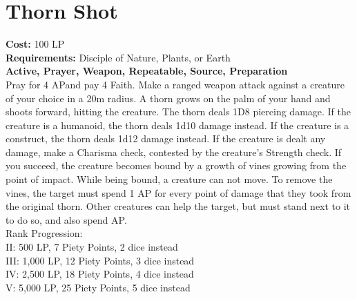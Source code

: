 \section{Thorn Shot}\label{prayer:thornShot}
\textbf{Cost:} 100 LP\\
\textbf{Requirements:} Disciple of Nature, Plants, or Earth \\
\textbf{Active, Prayer, Weapon, Repeatable, Source, Preparation}\\
Pray for 4 APand pay 4 Faith.
Make a ranged weapon attack against a creature of your choice in a 20m radius.
A thorn grows on the palm of your hand and shoots forward, hitting the creature.
The thorn deals 1D8 piercing damage.
If the creature is a humanoid, the thorn deals 1d10 damage instead.
If the creature is a construct, the thorn deals 1d12 damage instead.
If the creature is dealt any damage, make a Charisma check, contested by the creature's Strength check.
If you succeed, the creature becomes bound by a growth of vines growing from the point of impact.
While being bound, a creature can not move.
To remove the vines, the target must spend 1 AP for every point of damage that they took from the original thorn.
Other creatures can help the target, but must stand next to it to do so, and also spend AP.
\\
Rank Progression:\\
II: 500 LP, 7 Piety Points, 2 dice instead\\
III: 1,000 LP, 12 Piety Points, 3 dice instead\\
IV: 2,500 LP, 18 Piety Points, 4 dice instead\\
V: 5,000 LP, 25 Piety Points, 5 dice instead\\